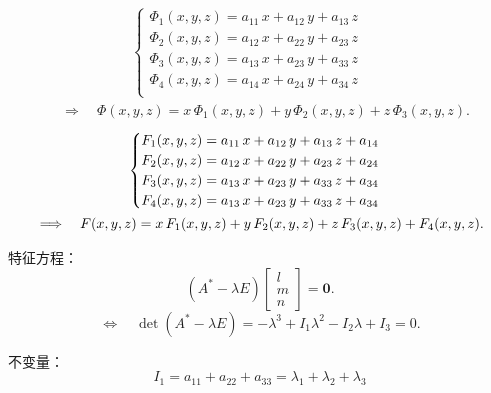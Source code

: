 \jg
\begin{equation}
\label{varPhi_i}
\begin{split}
&
\hspace{5em}
\begin{cases}
\varPhi_1(x,y,z)=a_{11} \, x + a_{12} \, y + a_{13} \, z \\
\varPhi_2(x,y,z)=a_{12} \, x+ a_{22} \, y + a_{23} \, z \\
\varPhi_3(x,y,z)=a_{13} \, x+ a_{23} \, y + a_{33} \, z \\
\varPhi_4(x,y,z)=a_{14} \, x+ a_{24} \, y + a_{34} \, z \\
\end{cases}\\
&
\Longrightarrow
\quad
\varPhi(x,y,z) = x \, \varPhi_1(x,y,z)+y \, \varPhi_2(x,y,z)+z \, \varPhi_3(x,y,z).
\end{split}
\end{equation}
\jg
\begin{equation}
\label{F_i}
\begin{split}
&
\hspace{6.5em}
\begin{cases}
F_1(x,y,z)=a_{11} \, x + a_{12} \, y + a_{13} \, z + a_{14} \\
F_2(x,y,z)=a_{12} \, x+ a_{22} \, y + a_{23} \, z + a_{24} \\
F_3(x,y,z)=a_{13} \, x+ a_{23} \, y + a_{33} \, z + a_{34} \\
F_4(x,y,z)=a_{13} \, x+ a_{23} \, y + a_{33} \, z + a_{34} \\
\end{cases}\\
&
\Longrightarrow
\quad
F(x,y,z) = x \, F_1(x,y,z)+y \, F_2(x,y,z)+z \, F_3(x,y,z) + F_4(x,y,z).
\end{split}
\end{equation}

\par 特征方程：
\begin{equation}
\left( A^* - \lambda E \right)
\left[
\begin{array}{c}
l \\
m \\
n
\end{array}
\right] 
= \bm{0}.
\end{equation}
\begin{equation}
\Longleftrightarrow
\quad
\det(A^* - \lambda E) = -\lambda^3 +I_1\lambda^2 - I_2\lambda + I_3 = 0.
\end{equation}
\par 不变量：
\begin{equation}
I_1=a_{11}+a_{22}+a_{33} = \lambda_1 +\lambda_2 +\lambda_3
\end{equation}

